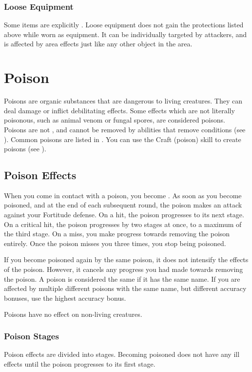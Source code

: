     \subsubsection{Loose Equipment}\label{Loose Equipment}
      Some items are explicitly .
      Loose equipment does not gain the protections listed above while worn as equipment.
      It can be individually targeted by attackers, and is affected by area effects just like any other object in the area.

\section{Poison}\label{Poison}
  Poisons are organic substances that are dangerous to living creatures.
  They can deal damage or inflict debilitating effects.
  Some effects which are not literally poisonous, such as animal venom or fungal spores, are considered poisons.
  Poisons are not , and cannot be removed by abilities that remove conditions (see ).
  Common poisons are listed in .
  You can use the Craft (poison) skill to create poisons (see ).

  \subsection{Poison Effects}\label{Poison Effects}
    When you come in contact with a poison, you become .
    As soon as you become poisoned, and at the end of each subsequent round, the poison makes an attack against your Fortitude defense.
    On a hit, the poison progresses to its next stage.
    On a critical hit, the poison progresses by two stages at once, to a maximum of the third stage.
    On a miss, you make progress towards removing the poison entirely.
    Once the poison misses you three times, you stop being poisoned.

    If you become poisoned again by the same poison, it does not intensify the effects of the poison.
    However, it cancels any progress you had made towards removing the poison.
    A poison is considered the same if it has the same name.
    If you are affected by multiple different poisons with the same name, but different accuracy bonuses, use the highest accuracy bonus.

    Poisons have no effect on non-living creatures.

    \subsubsection{Poison Stages}
      Poison effects are divided into stages.
      Becoming poisoned does not have any ill effects until the poison progresses to its first stage.

